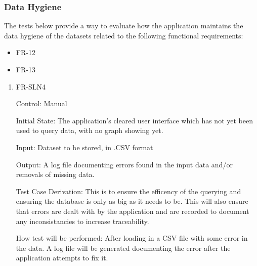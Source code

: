 \documentclass[12pt, titlepage]{article}
\begin{document}
      \subsubsection{Data Hygiene}
      The tests below provide a way to evaluate how the application maintains the data hygiene of the datasets related to the following functional requirements:
      \begin{itemize}
        \item FR-12
        \item FR-13
      \end{itemize}
        \begin{enumerate}
        
          \item{FR-SLN4}
          
          Control: Manual
                    
          Initial State: The application's cleared user interface which has not yet been used to query data, with no graph showing yet.
                    
          Input: Dataset to be stored, in .CSV format
                    
          Output: A log file documenting errors found in the input data and/or removals of missing data.
          
          Test Case Derivation: This is to ensure the efficency of the querying and ensuring the database is only as big as it needs to be. This will also ensure that errors are dealt with by the application and are recorded to document any inconsistancies to increase traceability.
                    
          How test will be performed: After loading in a CSV file with some error in the data. A log file will be generated documenting the error after the application attempts to fix it. 
          
          \end{enumerate}
\end{document}
